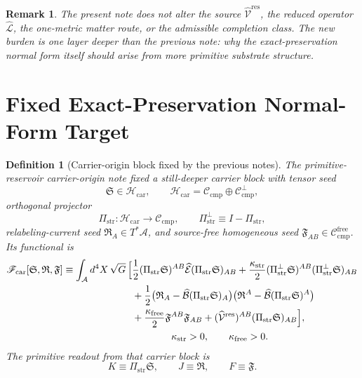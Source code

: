\documentclass[11pt]{article}
\newcommand{\Sub}{\mathcal A}
\newcommand{\ResidualLift}{\widehat{\mathcal V}^{\mathrm{res}}}
\newcommand{\SubEinLin}{\widehat{\mathcal E}}
\newcommand{\SubGaugeVec}{\widehat{\mathcal B}}
\newcommand{\SubReducedEin}{\widehat{\mathcal L}}
\newcommand{\CompClass}{\mathscr C_{\mathrm{cmp}}}
\newcommand{\CompFree}{\mathscr C_{\mathrm{cmp}}^{\mathrm{free}}}
\newcommand{\CarrierFunctional}{\mathscr F_{\mathrm{car}}}
\newcommand{\FreeStiff}{\kappa_{\mathrm{free}}}
\newcommand{\PrimStrain}{K}
\newcommand{\PrimNeutral}{J}
\newcommand{\PrimFree}{F}
\newcommand{\CarrierClass}{\mathscr H_{\mathrm{car}}}
\newcommand{\CarrierProj}{\Pi_{\mathrm{str}}}
\newcommand{\CarrierPerp}{\Pi_{\mathrm{str}}^{\perp}}
\newcommand{\CarrierGap}{\kappa_{\mathrm{str}}}
\newcommand{\CarrierSeed}{\mathfrak S}
\newcommand{\RelabelSeed}{\mathfrak R}
\newcommand{\FreeSeed}{\mathfrak F}
\newtheorem{definition}{Definition}
\newtheorem{remark}{Remark}
\begin{document}
\begin{remark}
The present note does not alter the source \(\ResidualLift\), the reduced operator \(\SubReducedEin\), the one-metric matter route, or the admissible completion class. The new burden is one layer deeper than the previous note: why the exact-preservation normal form itself should arise from more primitive substrate structure.
\end{remark}

\section{Fixed Exact-Preservation Normal-Form Target}

\begin{definition}[Carrier-origin block fixed by the previous notes]
\label{def:carrier}
The primitive-reservoir carrier-origin note fixed a still-deeper carrier block with tensor seed
\[
\CarrierSeed\in\CarrierClass,
\qquad
\CarrierClass=\CompClass\oplus \CompClass^\perp,
\]
orthogonal projector
\[
\CarrierProj:\CarrierClass\to\CompClass,
\qquad
\CarrierPerp\equiv I-\CarrierProj,
\]
relabeling-current seed \(\RelabelSeed_A\in T^*\Sub\), and source-free homogeneous seed \(\FreeSeed_{AB}\in\CompFree\). Its functional is
\begin{equation}
\begin{aligned}
\CarrierFunctional[\CarrierSeed,\RelabelSeed,\FreeSeed]
\equiv
\int_{\Sub} d^4X\,\sqrt{G}\,
\Bigl[
&\frac12 (\CarrierProj\CarrierSeed)^{AB}
\SubEinLin(\CarrierProj\CarrierSeed)_{AB}
+\frac{\CarrierGap}{2}(\CarrierPerp\CarrierSeed)^{AB}(\CarrierPerp\CarrierSeed)_{AB}
\\
&+\frac12\bigl(\RelabelSeed_A-\SubGaugeVec(\CarrierProj\CarrierSeed)_A\bigr)
\bigl(\RelabelSeed^A-\SubGaugeVec(\CarrierProj\CarrierSeed)^A\bigr)
\\
&+\frac{\FreeStiff}{2}\FreeSeed^{AB}\FreeSeed_{AB}
+(\ResidualLift)^{AB}(\CarrierProj\CarrierSeed)_{AB}
\Bigr],
\\
&\qquad\qquad \CarrierGap>0,\qquad \FreeStiff>0.
\end{aligned}
\label{eq:car}
\end{equation}
The primitive readout from that carrier block is
\begin{equation}
\PrimStrain\equiv \CarrierProj\CarrierSeed,
\qquad
\PrimNeutral\equiv \RelabelSeed,
\qquad
\PrimFree\equiv \FreeSeed.
\label{eq:readout}
\end{equation}
\end{definition}
\end{document}
